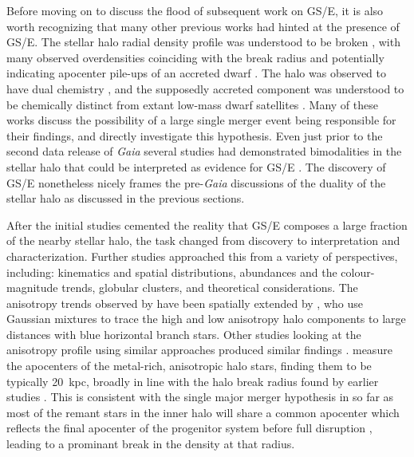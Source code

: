 Before moving on to discuss the flood of subsequent work on GS/E, it is also worth recognizing that many other previous works had hinted at the presence of GS/E. The stellar halo radial density profile was understood to be broken \parencite{deason11,sesar11}, with many observed overdensities coinciding with the break radius and potentially indicating apocenter pile-ups of an accreted dwarf \parencite{li16}. The halo was observed to have dual chemistry \parencite{carollo07,nissen10}, and the supposedly accreted component was understood to be chemically distinct from extant low-mass dwarf satellites \parencite{venn04}. Many of these works discuss the possibility of a large single merger event being responsible for their findings, and \textcite{deason13} directly investigate this hypothesis. Even just prior to the second data release of \textit{Gaia} several studies had demonstrated bimodalities in the stellar halo that could be interpreted as evidence for GS/E \parencite{bonaca17,deason17,hayes18}. The discovery of GS/E nonetheless nicely frames the pre-\textit{Gaia} discussions of the duality of the stellar halo as discussed in the previous sections.

After the initial studies cemented the reality that GS/E composes a large fraction of the nearby stellar halo, the task changed from discovery to interpretation and characterization. Further studies approached this from a variety of perspectives, including: kinematics and spatial distributions, abundances and the colour-magnitude trends, globular clusters, and theoretical considerations. The anisotropy trends observed by \textcite{belokurov18} have been spatially extended by \textcite{lancaster19}, who use Gaussian mixtures to trace the high and low anisotropy halo components to large distances with blue horizontal branch stars. Other studies looking at the anisotropy profile using similar approaches produced similar findings \parencite{necib19,bird19}. \textcite{deason18} measure the apocenters of the metal-rich, anisotropic halo stars, finding them to be typically 20~kpc, broadly in line with the halo break radius found by earlier studies \parencite[e.g.][]{deason11,sesar11,xue15}. This is consistent with the single major merger hypothesis in so far as most of the remant stars in the inner halo will share a common apocenter which reflects the final apocenter of the progenitor system before full disruption \parencite[indeed, this was the driver for the hypothesis of][]{deason13}, leading to a prominant break in the density at that radius. 

